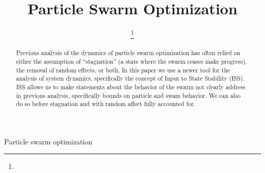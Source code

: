 \documentclass[journal]{IEEEtran}
\begin{document}
\title{Particle Swarm Optimization}

\author{

\thanks{}
}

\markboth{}{}

\maketitle

\begin{abstract}
Previous analysis of the dynamics of particle swarm optimization has often relied on either the assumption of ``stagnation'' (a state where the swarm ceases make progress), the removal of random effects, or both.
In this paper we use a newer tool for the analysis of system dynamics, specifically the concept of Input to State Stability (ISS).
ISS allows us to make statements about the behavior of the swarm not clearly address in previous analysis, specifically bounds on particle and swam behavior.
We can also do so before stagnation and with random affect fully accounted for. 
\end{abstract}

\begin{IEEEkeywords}
Particle swarm optimization
\end{IEEEkeywords}

\IEEEpeerreviewmaketitle











\end{document}
